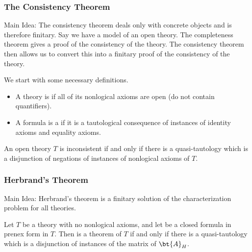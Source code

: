 
\subsubsection{The Consistency Theorem}

Main Idea: The consistency theorem deals only with concrete objects 
and is therefore finitary. Say we have a 
model of an open theory. The completeness theorem gives a proof of 
the consistency of the theory. The consistency theorem then allows 
us to convert this into a finitary proof of the consistency of the 
theory.

We start with some necessary definitions.

\begin{itemize}
	\item A theory is  if all of 
	its nonlogical axioms are open (do not contain quantifiers).
	
	\item A formula is a 
	 if it is a 
	tautological consequence of instances of identity axioms and 
	equality axioms.
\end{itemize}

\begin{theorem}
	An open theory $T$ is inconsistent if and only if there is a 
	quasi-tautology which is a disjunction of negations of 
	instances of nonlogical axioms of $T$.
\end{theorem}


\subsubsection{Herbrand's Theorem}

Main Idea: Herbrand's theorem is a finitary solution of the 
characterization problem for all theories.

\begin{theorem}
	Let $T$ be a theory with no nonlogical axioms, and let  
	be a closed formula in prenex form in $T$. Then  is a 
	theorem of $T$ if and only if there is a quasi-tautology which 
	is a disjunction of instances of the matrix of $\bt{A}_H$.
\end{theorem}

